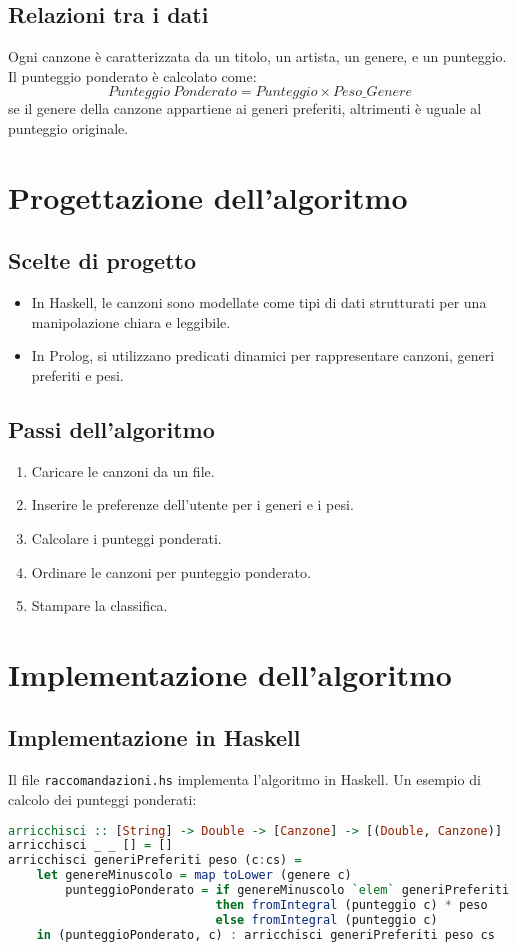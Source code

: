 \documentclass[a4paper,11pt]{article}
\begin{document}
\subsection{Relazioni tra i dati}
Ogni canzone è caratterizzata da un titolo, un artista, un genere, e un punteggio. Il punteggio ponderato è calcolato come:
\[
Punteggio\ Ponderato = Punteggio \times Peso\_{Genere}
\]
se il genere della canzone appartiene ai generi preferiti, altrimenti è uguale al punteggio originale.

\newpage
\section{Progettazione dell'algoritmo}
\subsection{Scelte di progetto}
\begin{itemize}
    \item In Haskell, le canzoni sono modellate come tipi di dati strutturati per una manipolazione chiara e leggibile.
    \item In Prolog, si utilizzano predicati dinamici per rappresentare canzoni, generi preferiti e pesi.
\end{itemize}

\subsection{Passi dell'algoritmo}
\begin{enumerate}
    \item Caricare le canzoni da un file.
    \item Inserire le preferenze dell'utente per i generi e i pesi.
    \item Calcolare i punteggi ponderati.
    \item Ordinare le canzoni per punteggio ponderato.
    \item Stampare la classifica.
\end{enumerate}

\newpage
\section{Implementazione dell'algoritmo}
\subsection{Implementazione in Haskell}
Il file \texttt{raccomandazioni.hs} implementa l'algoritmo in Haskell. Un esempio di calcolo dei punteggi ponderati:
\begin{lstlisting}[language=Haskell,caption=Calcolo dei punteggi ponderati]
arricchisci :: [String] -> Double -> [Canzone] -> [(Double, Canzone)]
arricchisci _ _ [] = []
arricchisci generiPreferiti peso (c:cs) =
    let genereMinuscolo = map toLower (genere c)
        punteggioPonderato = if genereMinuscolo `elem` generiPreferiti
                             then fromIntegral (punteggio c) * peso
                             else fromIntegral (punteggio c)
    in (punteggioPonderato, c) : arricchisci generiPreferiti peso cs
\end{lstlisting}
\end{document}
